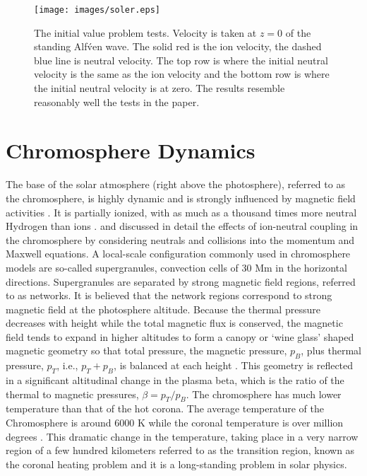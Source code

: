 \documentclass[12pt,upcase]{umlthesis}
\begin{document}
\begin{figure}[ht!]
	\texttt{[image: images/soler.eps]}
	\caption{The \citet{Soler2013} initial value problem tests. Velocity is taken at $z=0$ of the standing Alf\'ven wave. The solid red is the ion velocity, the dashed blue line is neutral velocity. The top row is where the initial neutral velocity is the same as the ion velocity and the bottom row is where the initial neutral velocity is at zero. The results resemble reasonably well the tests in the \citet{Soler2013} paper.}\label{fig:soler}
\end{figure}

\chapter{Chromosphere Dynamics}\label{chap:chromosphere} 

The base of the solar atmosphere (right above the photosphere), referred to as the chromosphere, is highly dynamic and is strongly influenced by magnetic field activities \citep{Hasan08}. It is partially ionized, with as much as a thousand times more neutral Hydrogen than ions \citep{Alissandrakis2018}. \citet{Song2011} and \citet{Leake2014} discussed in detail the effects of ion-neutral coupling in  the chromosphere by considering neutrals and collisions into the momentum and Maxwell equations. A local-scale configuration commonly used in chromosphere models are so-called supergranules, convection cells of 30 Mm in the horizontal directions. Supergranules are separated by strong magnetic field regions, referred to as networks. It is believed that the network regions correspond to strong magnetic field at the photosphere altitude. Because the thermal pressure decreases with height while the total magnetic flux is conserved, the magnetic field tends to expand in higher altitudes to form a canopy or `wine glass' shaped magnetic geometry so that total pressure, the  magnetic pressure, $p_B$, plus thermal pressure, $p_T$, i.e., $p_T+p_B$, is balanced at each height \citep{gabriel1976}. This geometry is reflected in a significant altitudinal change in the plasma beta, which is the ratio of the thermal to magnetic pressures, $\beta=p_T/p_B$. The chromosphere has much lower temperature than that of the hot corona. The average temperature of the Chromosphere is around 6000 K while the coronal temperature is over million degrees \citep{AvrettLoeser2008}. This dramatic change in the temperature, taking place in a very narrow region of a few hundred kilometers referred to as the transition region, known as the coronal heating problem and it is a long-standing problem in solar physics.
\end{document}
